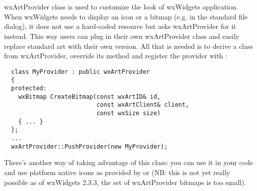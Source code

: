 %
%

\section{}\label{wxartprovider}

wxArtProvider class is used to customize the look of wxWidgets application.
When wxWidgets needs to display an icon or a bitmap (e.g. in the standard file
dialog), it does not use a hard-coded resource but asks wxArtProvider for it
instead. This way users can plug in their own wxArtProvider class and easily
replace standard art with their own version. All
that is needed is to derive a class from wxArtProvider, override its
 method and register the
provider with
:

\begin{verbatim}
  class MyProvider : public wxArtProvider
  {
  protected:
    wxBitmap CreateBitmap(const wxArtID& id, 
                          const wxArtClient& client,
                          const wxSize size)
    { ... }
  };
  ...
  wxArtProvider::PushProvider(new MyProvider);
\end{verbatim}

There's another way of taking advantage of this class: you can use it in your code and use
platform native icons as provided by  or 
 (NB: this is not yet really
possible as of wxWidgets 2.3.3, the set of wxArtProvider bitmaps is too
small). 

\label{artprovideridentifying}

